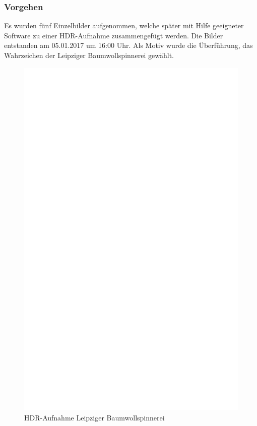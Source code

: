 \documentclass[liststotoc,bibtotoc,fontsize=14pt,]{scrreprt}
\begin{document}
	\subsubsection{Vorgehen}
	Es wurden fünf Einzelbilder aufgenommen, welche später mit Hilfe geeigneter Software zu einer HDR-Aufnahme zusammengefügt werden. Die Bilder entstanden am 05.01.2017 um 16:00 Uhr. Als Motiv wurde die Überführung, das Wahrzeichen der Leipziger Baumwollspinnerei gewählt. 
	
	\newpage
	\begin{figure}[h]
		\includegraphics[width=\linewidth]{img/ph.jpg}
		\caption{HDR-Aufnahme Leipziger Baumwollspinnerei}
	\end{figure}
\end{document}
